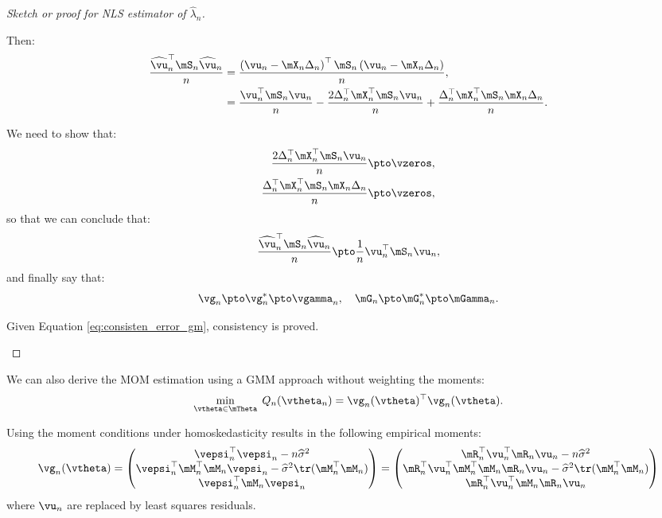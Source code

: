 \documentclass[english,12pt]{book}\usepackage[]{graphicx}\usepackage[]{xcolor}
\begin{document}
\begin{proof}[Sketch or proof for NLS estimator of $\widehat{\lambda}_n$]
\begin{enumerate}
Then:
\begin{equation*}
\begin{aligned}
\frac{\widehat{\vu}^\top_n\mS_n\widehat{\vu}_n}{n} & = \frac{\left(\vu_n - \mX_n\Delta_n \right)^\top\mS_n\left(\vu_n - \mX_n\Delta_n \right)}{n}, \\
& = \frac{\vu^\top_n\mS_n\vu_n}{n}- \frac{2\Delta_n^\top\mX^\top_n\mS_n\vu_n}{n}+\frac{\Delta_n^\top\mX^\top_n\mS_n\mX_n\Delta_n}{n}.
\end{aligned}
\end{equation*}

We need to show that:
\begin{equation*}
\begin{aligned}
  \frac{2\Delta_n^\top\mX^\top_n\mS_n\vu_n}{n} & \pto \vzeros, \\
  \frac{\Delta_n^\top\mX^\top_n\mS_n\mX_n\Delta_n}{n} & \pto \vzeros,
\end{aligned}
\end{equation*}
%
so that we can conclude that:
\begin{equation*}
\frac{\widehat{\vu}^\top_n\mS_n\widehat{\vu}_n}{n}  \pto \frac{1}{n}\vu^\top_n\mS_n\vu_n,
\end{equation*}
%
and finally say that:
\begin{equation*}
\vg_n\pto \vg_n^*\pto \vgamma_n, \quad \mG_n\pto \mG^*_n\pto \mGamma_n.
\end{equation*}

Given Equation \eqref{eq:consisten_error_gm}, consistency is proved.
\end{enumerate}
\end{proof}

We can also derive the MOM estimation using a GMM approach without weighting the moments:
\begin{equation*}
\min_{\vtheta \in \mTheta}\; Q_n(\vtheta_n) = \vg_n(\vtheta)^\top \vg_n(\vtheta). 
\end{equation*}

Using the moment conditions under homoskedasticity results in the following empirical moments:
\begin{equation*}
  \vg_n(\vtheta)  = 
  \begin{pmatrix}
  \vepsi_n^\top\vepsi_n  - n\widehat{\sigma}^2 \\
  \vepsi_n^\top\mM_n^\top\mM_n\vepsi_n - \widehat{\sigma}^2\tr(\mM_n^\top\mM_n) \\
  \vepsi_n^\top\mM_n\vepsi_n 
  \end{pmatrix} =
  \begin{pmatrix}
   \mR_n^\top\vu_n^\top\mR_n\vu_n  - n\widehat{\sigma}^2 \\
   \mR_n^\top\vu_n^\top\mM_n^\top\mM_n\mR_n\vu_n - \widehat{\sigma}^2\tr(\mM_n^\top\mM_n) \\
   \mR_n^\top\vu_n^\top\mM_n\mR_n\vu_n
  \end{pmatrix}
\end{equation*}
%
where $\vu_n$ are replaced by least squares residuals. 
\end{document}
